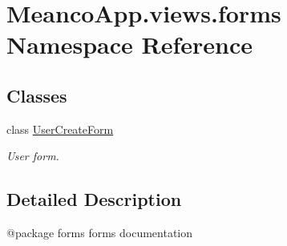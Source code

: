 \hypertarget{namespace_meanco_app_1_1views_1_1forms}{}\section{Meanco\+App.\+views.\+forms Namespace Reference}
\label{namespace_meanco_app_1_1views_1_1forms}
\subsection*{Classes}
\begin{DoxyCompactItemize}
\item 
class \hyperlink{class_meanco_app_1_1views_1_1forms_1_1_user_create_form}{User\+Create\+Form}
\begin{DoxyCompactList}\small\item\em User form. \end{DoxyCompactList}\end{DoxyCompactItemize}


\subsection{Detailed Description}
\begin{DoxyVerb}@package forms
forms documentation\end{DoxyVerb}
 